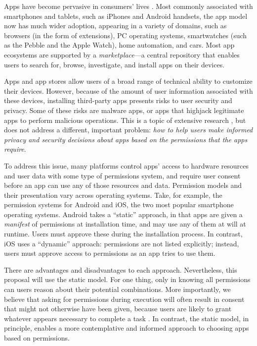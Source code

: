 \documentclass[11pt]{article}
\begin{document}
Apps have become pervasive
in consumers' lives 
\cite{gplay-50-billion, apple-50-billion}.
Most commonly associated with smartphones and tablets, 
such as iPhones and Android handsets, the app model now has much 
wider adoption, appearing in a variety of domains,
such as browsers (in the form of extensions), PC operating 
systems, smartwatches (such as the Pebble and the Apple Watch), 
home automation,
and cars.
Most app ecosystems are supported by a
\emph{marketplace}---a central repository that
enables users to search for, browse,
investigate, and install apps on their devices. 

Apps and app stores allow users of a broad range
of technical ability to customize their devices.
However,  
because of the amount of user information associated with these 
devices, installing third-party apps presents 
risks to user security and privacy. Some of these risks are malware apps, or 
apps that highjack legitimate apps
to perform malicious operations. This is a topic
of extensive research 
\cite{droidrisk-2013, android-repackaged-CODASPY12, comDroid-MOBISYS11}, 
but does not address a different,
important problem: \emph{how to help users make informed privacy and
  security decisions about apps based on the permissions that the apps
  require}.

To address this issue, many
platforms control apps' access to hardware resources 
and user data with some type of permissions system,
and require user consent before an app can use any
of those resources and data. Permission models and their presentation 
vary across operating systems. Take, for example, the permission systems
for Android and iOS, the two most popular smartphone operating systems. 
Android takes a ``static'' approach, in that apps are given a
\emph{manifest} of
permissions at installation time, and may use any of them at will at runtime.
Users must approve these during the installation
process. In contrast, iOS uses a ``dynamic''
approach: permissions are not listed explicitly; instead, users must
approve access to permissions as an app tries to use them.

There are advantages and disadvantages to each approach. Nevertheless,
this proposal will use the static model. For one thing, only in 
knowing all permissions can users reason about their potential
combinations. More importantly, we believe that asking for permissions
during execution will often result in consent that might not otherwise
have been given, because users are likely to grant whatever appears
necessary to complete a task \cite{phisher-wanings-SIGCHI08}. In contrast, the static
model, in principle, enables a more contemplative and
informed approach to choosing apps based on permissions.
\end{document}
